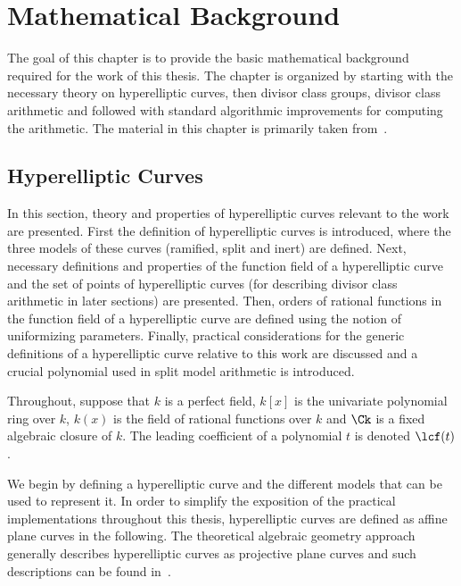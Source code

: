 
\chapter{Mathematical Background}
\label{cha:bg} 
The goal of this chapter is to provide the basic mathematical background
required for the work of this thesis. The chapter is organized by starting with
the necessary theory on hyperelliptic curves, then divisor class groups,
divisor class arithmetic and followed with standard algorithmic improvements for
computing the arithmetic. The material in this chapter is primarily taken
from~\cite{HandbookFF_2013,Galbraith_PKC_2012}.

\section{Hyperelliptic Curves}
\label{sec:hec}
In this section, theory and properties of hyperelliptic curves relevant to the
work are presented. First the definition of hyperelliptic curves is introduced,
where the three models of these curves (ramified, split and inert) are defined.
Next, necessary definitions and properties of the function field of a
hyperelliptic curve and the set of points of hyperelliptic curves (for
describing divisor class arithmetic in later sections) are presented. Then,
orders of rational functions in the function field of a hyperelliptic curve are
defined using the notion of uniformizing parameters. Finally, practical
considerations for the generic definitions of a hyperelliptic curve relative to
this work are discussed and a crucial polynomial used in split model arithmetic
is introduced.

Throughout, suppose that $k$ is a perfect field, $k[x]$ is the univariate
polynomial ring over $k$, $k(x)$ is the field of rational functions over $k$ and
$\Ck$ is a fixed algebraic closure of $k$. The leading coefficient of a polynomial
$t$ is denoted $\lcf(t)$. 

We begin by defining a hyperelliptic curve and the different models that can be
used to represent it. In order to simplify the exposition of the practical
implementations throughout this thesis, hyperelliptic curves are defined as
affine plane curves in the following. The theoretical algebraic geometry
approach generally describes hyperelliptic curves as projective plane curves
and such descriptions can be found
in~\cite{Galbraith_PKC_2012,CasselsFlynn_g2arithmetic_1996}.

